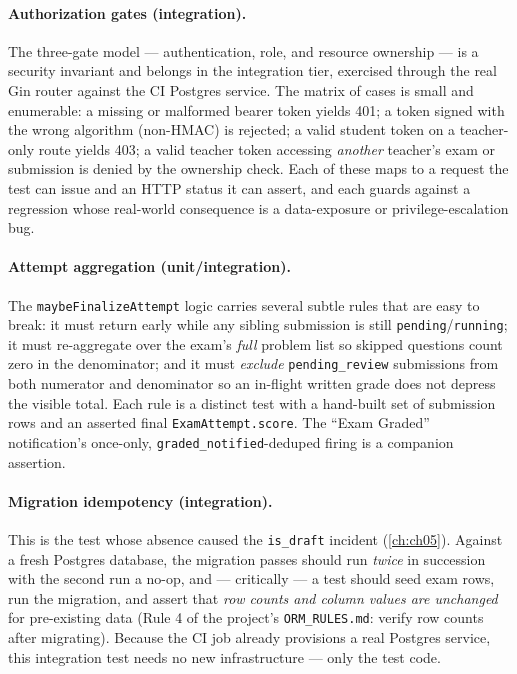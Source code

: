 \paragraph{Authorization gates (integration).} The three-gate model ---
authentication, role, and resource ownership --- is a security invariant
and belongs in the integration tier, exercised through the real Gin
router against the CI Postgres service. The matrix of cases is small and
enumerable: a missing or malformed bearer token yields 401; a token
signed with the wrong algorithm (non-HMAC) is rejected; a valid student
token on a teacher-only route yields 403; a valid teacher token accessing
\emph{another} teacher's exam or submission is denied by the ownership
check. Each of these maps to a request the test can issue and an HTTP
status it can assert, and each guards against a regression whose
real-world consequence is a data-exposure or privilege-escalation bug.

\paragraph{Attempt aggregation (unit/integration).} The
\texttt{maybeFinalizeAttempt} logic carries several subtle rules that are
easy to break: it must return early while any sibling submission is still
\texttt{pending}/\texttt{running}; it must re-aggregate over the exam's
\emph{full} problem list so skipped questions count zero in the
denominator; and it must \emph{exclude} \texttt{pending\_review}
submissions from both numerator and denominator so an in-flight written
grade does not depress the visible total. Each rule is a distinct test
with a hand-built set of submission rows and an asserted final
\texttt{ExamAttempt.score}. The ``Exam Graded'' notification's
once-only, \texttt{graded\_notified}-deduped firing is a companion
assertion.

\paragraph{Migration idempotency (integration).} This is the test whose
absence caused the \texttt{is\_draft} incident (\cref{ch:ch05}). Against a fresh Postgres
database, the migration passes should run \emph{twice} in succession with
the second run a no-op, and --- critically --- a test should seed exam
rows, run the migration, and assert that \emph{row counts and column
values are unchanged} for pre-existing data (Rule 4 of the project's
\texttt{ORM\_RULES.md}: verify row counts after migrating). Because the CI
job already provisions a real Postgres service, this integration test
needs no new infrastructure --- only the test code.


